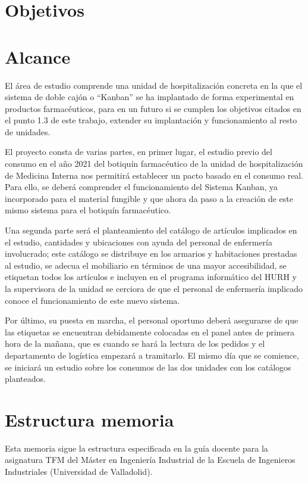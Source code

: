 \section{Objetivos}

\section{Alcance}

El área de estudio comprende una unidad de hospitalización concreta en la que el sistema de doble cajón o “Kanban” se ha implantado de forma experimental en productos farmacéuticos, para en un futuro si se cumplen los objetivos citados en el punto 1.3 de este trabajo, extender su implantación y funcionamiento al resto de unidades.

El proyecto consta de varias partes, en primer lugar, el estudio previo del consumo en el año 2021 del botiquín farmacéutico de la unidad de hospitalización de Medicina Interna nos permitirá establecer un pacto basado en el consumo real. Para ello, se deberá comprender el funcionamiento del Sistema Kanban, ya incorporado para el material fungible y que ahora da paso a la creación de este mismo sistema para el botiquín farmacéutico.

Una segunda parte será el planteamiento del catálogo de artículos implicados en el estudio, cantidades y ubicaciones con ayuda del personal de enfermería involucrado; este catálogo se distribuye en los armarios y habitaciones prestadas al estudio, se adecua el mobiliario en términos de una mayor accesibilidad, se etiquetan todos los artículos e incluyen en el programa informático del HURH y la supervisora de la unidad se cerciora de que el personal de enfermería implicado conoce el funcionamiento de este nuevo sistema.

Por último, su puesta en marcha, el personal oportuno deberá asegurarse de que las etiquetas se encuentran debidamente colocadas en el panel antes de primera hora de la mañana, que es cuando se hará la lectura de los pedidos y el departamento de logística empezará a tramitarlo. El mismo día que se comience, se iniciará un estudio sobre los consumos de las dos unidades con los catálogos planteados.

\section{Estructura memoria}

Esta memoria sigue la estructura especificada en la guía docente para la asignatura TFM del Máster en Ingeniería Industrial de la Escuela de Ingenieros Industriales (Universidad de Valladolid). \cite{lion2010}
